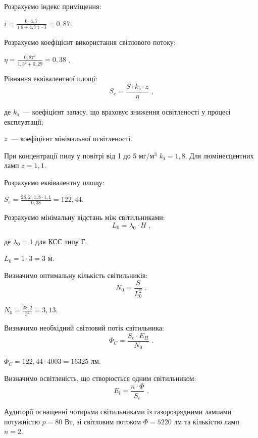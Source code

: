 \documentclass[a4paper,ukrainian,utf8,nocolumnsxix,floatsection,equationsection]{eskdtext}
\begin{document}
Розрахуємо індекс приміщення: 

$i = \frac{6 \cdot 4,7}{(6 + 4,7) \cdot 3} = 0,87 $.


Розрахуємо коефіцієнт використання світлового потоку:

$\eta = \frac{0,87^2}{1,3^2 + 0,29} = 0,38$ .


Рівняння еквівалентної площі:
\begin{equation}
	S_e = \frac{S \cdot k_\text{з} \cdot z}{\eta} \text{ ,}
\end{equation}

де $k_\text{з}$~--- коефіцієнт запасу, що враховує зниження освітленості у процесі експлуатації;

$z$~--- коефіцієнт мінімальної освітленості.


При концентрації пилу у повітрі від 1 до 5 мг/м$^3$ $k_\text{з} = 1,8$. Для люмінесцентних ламп $z = 1,1$.

Розрахуємо еквівалентну площу:

$S_e  = \frac{28,2 \cdot 1,8 \cdot 1,1}{0,38} = 122,44 $.


Розрахуємо мінімальну відстань між світильниками:
\begin{equation}
	L_0 = \lambda_0 \cdot H \text{ ,}
\end{equation}

де $\lambda_0 = 1$ для КСС типу Г. 

$L_0  = 1 \cdot 3 = 3\text{ м} $.


Визначимо оптимальну кількість світильників:
\begin{equation}
	N_0 = \frac{S}{L_0^2}  \text{ .}
\end{equation}

$N_0  = \frac{28,2}{3^2} = 3,13 $.


Визначимо необхідний світловий потік світильника:
\begin{equation}
	\Phi_C = \frac{S_e \cdot E_H}{N_0}  \text{ .}
\end{equation}

$\Phi_C  = {122,44 \cdot 400}{3} = 16325 \text{ лм} $.


Визначимо освітленість, що створюється одним світильником:
\begin{equation}
	E_l = \frac{n \cdot \Phi}{S_e} \text{ .}
\end{equation}

Аудиторії оснащенні чотирьма світильниками із газорозрядними лампами потужністю $p=80$ Вт, зі світловим потоком $\Phi=5220$ лм та кількістю ламп $n=2$.
\end{document}
